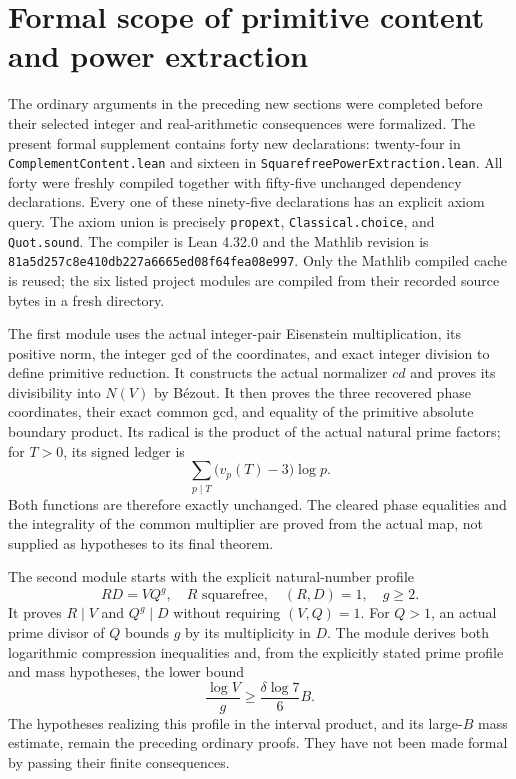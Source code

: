 \section{Formal scope of primitive content and power extraction}
\label{sec-collective-formal-scope}

The ordinary arguments in the preceding new sections were completed before
their selected integer and real-arithmetic consequences were formalized.
The present formal supplement contains forty new declarations:
twenty-four in \texttt{ComplementContent.lean} and sixteen in
\texttt{SquarefreePowerExtraction.lean}.
All forty were freshly compiled together with fifty-five unchanged
dependency declarations. Every one of these ninety-five declarations has
an explicit axiom query. The axiom union is precisely
\texttt{propext}, \texttt{Classical.choice}, and \texttt{Quot.sound}.
The compiler is Lean 4.32.0 and the Mathlib revision is
\texttt{81a5d257c8e410db227a6665ed08f64fea08e997}.
Only the Mathlib compiled cache is reused; the six listed project modules
are compiled from their recorded source bytes in a fresh directory.

The first module uses the actual integer-pair Eisenstein multiplication,
its positive norm, the integer gcd of the coordinates, and exact integer
division to define primitive reduction. It constructs the actual
normalizer \(c d\) and proves its divisibility into \(N(V)\) by B\'ezout.
It then proves the three recovered phase coordinates, their exact common
gcd, and equality of the primitive absolute boundary product. Its radical
is the product of the actual natural prime factors; for \(T>0\), its signed ledger is
\[
 \sum_{p\mid T}\bigl(v_p(T)-3\bigr)\log p.
\]
Both functions are therefore exactly unchanged. The cleared phase
equalities and the integrality of the common multiplier are proved from
the actual map, not supplied as hypotheses to its final theorem.

The second module starts with the explicit natural-number profile
\[
 RD=VQ^g,\quad R\text{ squarefree},\quad (R,D)=1,\quad g\ge2.
\]
It proves \(R\mid V\) and \(Q^g\mid D\) without requiring
\((V,Q)=1\). For \(Q>1\), an actual prime divisor of \(Q\) bounds
\(g\) by its multiplicity in \(D\). The module derives both logarithmic
compression inequalities and, from the explicitly stated prime profile
and mass hypotheses, the lower bound
\[
 \frac{\log V}{g}\ge\frac{\delta\log7}{6}B.
\]
The hypotheses realizing this profile in the interval product, and its
large-\(B\) mass estimate, remain the preceding ordinary proofs. They
have not been made formal by passing their finite consequences.

